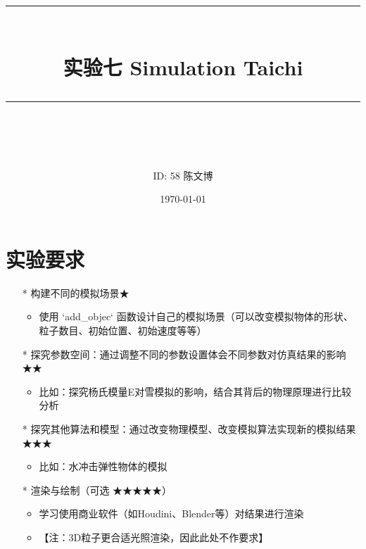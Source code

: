 \documentclass[14pt]{scrartcl} %
\title{	
	\normalfont\normalsize
	\rule{\linewidth}{0.5pt}\\ %
	\vspace{20pt} %
	{\huge 实验七	Simulation Taichi}\\ %
	\vspace{12pt} %
	\rule{\linewidth}{2pt}\\ %
	\vspace{12pt} %
}
\author{\LARGE ID: 58		陈文博} %
\date{\normalsize\today} %
\begin{document}
\maketitle %


\section{实验要求}


\begin{itemize}
	\item [*] 构建不同的模拟场景★
	\begin{itemize}
		\item 使用 `add\_objec` 函数设计自己的模拟场景（可以改变模拟物体的形状、粒子数目、初始位置、初始速度等等）
	\end{itemize}
	\item [*] 探究参数空间：通过调整不同的参数设置体会不同参数对仿真结果的影响★★
	\begin{itemize}
		\item 比如：探究杨氏模量E对雪模拟的影响，结合其背后的物理原理进行比较分析
	\end{itemize}
	\item [*] 探究其他算法和模型：通过改变物理模型、改变模拟算法实现新的模拟结果★★★
	\begin{itemize}
		\item 比如：水冲击弹性物体的模拟
	\end{itemize}
	\item [*] 渲染与绘制（可选 ★★★★★）
	\begin{itemize}
		\item 学习使用商业软件（如Houdini、Blender等）对结果进行渲染
		\item 【注：3D粒子更合适光照渲染，因此此处不作要求】
	\end{itemize}
\end{itemize}

\end{document}
